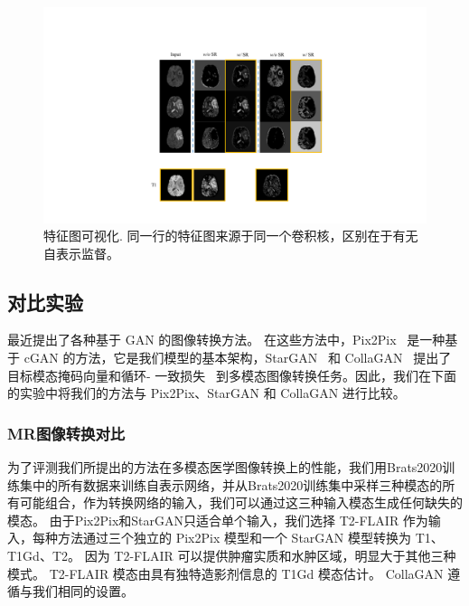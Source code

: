 \begin{figure}
	\begin{center}
		\includegraphics[width=0.8\columnwidth]{figures/JAGAN/ablation1.pdf}
	\end{center}
	\caption{特征图可视化. 同一行的特征图来源于同一个卷积核，区别在于有无自表示监督。}
	\label{fig:ablation1}
\end{figure}


\subsection{对比实验}

最近提出了各种基于 GAN 的图像转换方法。 在这些方法中，Pix2Pix~\cite{pix2pix} 是一种基于 cGAN 的方法，它是我们模型的基本架构，StarGAN~\cite{stargan} 和 CollaGAN~\cite{collagan} 提出了目标模态掩码向量和循环- 一致损失~\cite{cyclegan} 到多模态图像转换任务。因此，我们在下面的实验中将我们的方法与 Pix2Pix、StarGAN 和 CollaGAN 进行比较。

\subsubsection{MR图像转换对比}
为了评测我们所提出的方法在多模态医学图像转换上的性能，我们用Brats2020训练集中的所有数据来训练自表示网络，并从Brats2020训练集中采样三种模态的所有可能组合，作为转换网络的输入，我们可以通过这三种输入模态生成任何缺失的模态。 由于Pix2Pix和StarGAN只适合单个输入，我们选择 T2-FLAIR 作为输入，每种方法通过三个独立的 Pix2Pix 模型和一个 StarGAN 模型转换为 T1、T1Gd、T2。 因为 T2-FLAIR 可以提供肿瘤实质和水肿区域，明显大于其他三种模式。 T2-FLAIR 模态由具有独特造影剂信息的 T1Gd 模态估计。 CollaGAN 遵循与我们相同的设置。
 
